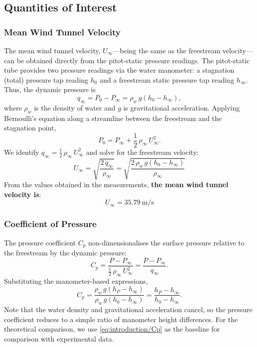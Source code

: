 \subsection{Quantities of Interest} \label{sec:results/quantities}

\subsubsection{Mean Wind Tunnel Velocity} \label{sec:results/quantities/mean_velocity}

The mean wind tunnel velocity, \( U_{\infty} \)---being the same as the freestream velocity---can be obtained directly from the pitot-static pressure readings. The pitot-static tube provides two pressure readings via the water manometer: a stagnation (total) pressure tap reading \(h_0\) and a freestream static pressure tap reading \(h_\infty\). Thus, the dynamic pressure is
\begin{equation}
    q_\infty = P_0 - P_\infty = \rho_w \, g \left( h_0 - h_\infty \right),
\end{equation}
where \(\rho_w\) is the density of water and \(g\) is gravitational acceleration. Applying Bernoulli's equation along a streamline between the freestream and the stagnation point,
\begin{equation}
    P_0 = P_\infty + \frac{1}{2}\,\rho_\infty\, U_\infty^2.
\end{equation}
We identify \(q_\infty = \tfrac{1}{2}\,\rho_\infty\, U_\infty^2\) and solve for the freestream velocity:
\begin{equation}
    \boxed{U_\infty = \sqrt{\frac{2\,q_\infty}{\rho_\infty}} = \sqrt{\frac{2\,\rho_w\, g\left(h_0 - h_\infty\right)}{\rho_\infty}}}
\end{equation}
From the values obtained in the measurements, \textbf{the mean wind tunnel velocity is}:
\begin{equation}
    \boxed{U_{\infty} = \qty{35.79}{\m\per\s}}
\end{equation}

\subsubsection{Coefficient of Pressure} \label{sec:results/quantities/Cp}

The pressure coefficient \(C_p\) non-dimensionalises the surface pressure relative to the freestream by the dynamic pressure:
\begin{equation}
    C_p = \frac{P - P_\infty}{\tfrac{1}{2}\,\rho_\infty\, U_\infty^2} = \frac{P - P_\infty}{q_\infty}.
\end{equation}
Substituting the manometer-based expressions,
\begin{equation}
    C_p = \frac{\rho_w\, g\left(h_P - h_\infty\right)}{\rho_w\, g\left(h_0 - h_\infty\right)} = \frac{h_P - h_\infty}{h_0 - h_\infty}.
\end{equation}
Note that the water density and gravitational acceleration cancel, so the pressure coefficient reduces to a simple ratio of manometer height differences. For the theoretical comparison, we use \eqref{eq:introduction/Cp} as the baseline for comparison with experimental data.

